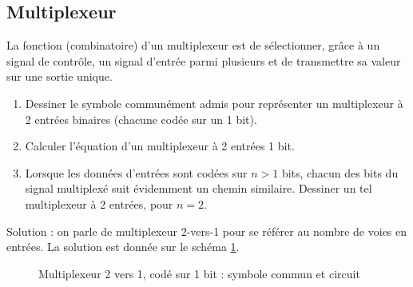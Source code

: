\documentclass[a4paper,11pt]{article}
\begin{document}
\subsection{Multiplexeur}
La fonction (combinatoire) d'un multiplexeur est de sélectionner, grâce à un signal de contrôle, un signal d'entrée parmi plusieurs et de transmettre sa valeur sur une sortie unique.
\begin{enumerate}
\item Dessiner le symbole communément admis pour représenter un multiplexeur à 2 entrées binaires (chacune codée sur un 1 bit).
\item Calculer l'équation d'un multiplexeur à 2 entrées 1 bit.
\item Lorsque les données d'entrées sont codées sur $n>1$ bits, chacun des bits du signal multiplexé suit évidemment un chemin similaire. Dessiner un tel multiplexeur à 2 entrées, pour $n=2$.
\end{enumerate}

\begin{cadre}
Solution : on parle de multiplexeur 2-vers-1 pour se référer au nombre de voies en entrées. La solution est donnée sur le schéma \ref{mux}.
\end{cadre}

\begin{figure}[!h]
  \centering
  \caption{Multiplexeur 2 vers 1, codé sur 1 bit : symbole commun et circuit}
  \label{mux}
\end{figure}
\end{document}
